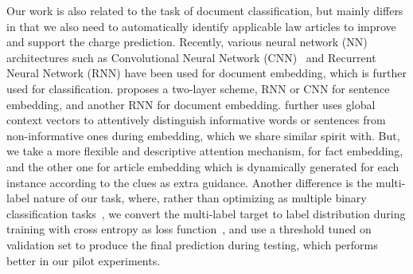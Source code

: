 Our work is also related to the task of document classification, but mainly differs in that we also need to automatically identify applicable law articles to improve and support the charge prediction.
Recently, various neural network (NN) architectures such as Convolutional Neural Network (CNN)~\cite{kim2014convolutional} and Recurrent Neural Network (RNN) have been used for document embedding, which is further used for classification.
\cite{tang2015document} proposes a two-layer scheme, RNN or CNN for sentence embedding, and another RNN for document embedding.
\cite{yang2016hierarchical} further uses global context vectors to attentively distinguish informative words or sentences from non-informative ones during embedding, which we share similar spirit with. 
But, we take a more flexible and descriptive  attention mechanism,  for fact embedding, and the other one for article embedding which is  dynamically generated for each instance according to the  clues as extra guidance.
%
Another difference is the multi-label nature of our task, where, rather than optimizing as multiple binary classification tasks~\cite{nam2014large}, 
we convert the multi-label target to label distribution during training with cross entropy as loss function~\cite{kurata2016improved}, and use a threshold tuned on validation set to produce the final prediction during testing, which performs better  in our pilot experiments.
